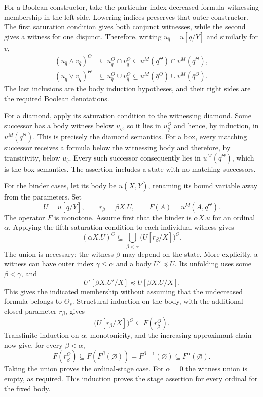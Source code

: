 For a Boolean constructor, take the particular
index-decreased formula witnessing membership in
the left side. Lowering indices preserves that
outer constructor. The first saturation condition
gives both conjunct witnesses, while the second
gives a witness for one disjunct. Therefore, writing
\(u_{\bar q}=u[\bar q/\bar Y]\) and similarly
for \(v\),
\[
\begin{aligned}
 (u_{\bar q}\land v_{\bar q})^\Theta
     &\subseteq u_{\bar q}^\Theta\cap v_{\bar q}^\Theta
       \subseteq u^M(\bar q^\Theta)\cap v^M(\bar q^\Theta),\\
 (u_{\bar q}\lor v_{\bar q})^\Theta
     &\subseteq u_{\bar q}^\Theta\cup v_{\bar q}^\Theta
       \subseteq u^M(\bar q^\Theta)\cup v^M(\bar q^\Theta).
\end{aligned}
\]
The last inclusions are the body induction hypotheses,
and their right sides are the required Boolean denotations.

For a diamond, apply its saturation condition to
the witnessing diamond. Some successor has a body
witness below \(u_{\bar q}\), so it lies in
\(u_{\bar q}^\Theta\) and hence, by induction,
in \(u^M(\bar q^\Theta)\). This is precisely the
diamond semantics. For a box, every matching
successor receives a formula below the witnessing
body and therefore, by transitivity, below
\(u_{\bar q}\). Every such successor consequently
lies in \(u^M(\bar q^\Theta)\), which is the
box semantics. The assertion includes a state
with no matching successors.

For the binder cases, let its body be
\(u(X,\bar Y)\), renaming its bound variable
away from the parameters. Set
\[
 U=u[\bar q/\bar Y],\qquad
 r_\beta=\beta X.U,\qquad
 F(A)=u^M(A,\bar q^\Theta).
\]
The operator \(F\) is monotone. Assume first
that the binder is \(\alpha X.u\) for an
ordinal \(\alpha\). Applying the fifth
saturation condition to each individual witness gives
\[
 (\alpha X.U)^\Theta
       \subseteq\bigcup_{\beta<\alpha}
                  \bigl(U[r_\beta/X]\bigr)^\Theta.
\]
The union is necessary: the witness \(\beta\)
may depend on the state. More explicitly, a witness
can have outer index \(\gamma\leq\alpha\) and
a body \(U'\preceq U\). Its unfolding uses some
\(\beta<\gamma\), and
\[
 U'[\beta X.U'/X]\preceq U[\beta X.U/X].
\]
This gives the indicated membership without assuming
that the undecreased formula belongs to \(\Theta_s\).
Structural induction on the body, with the additional
closed parameter \(r_\beta\), gives
\[
 \bigl(U[r_\beta/X]\bigr)^\Theta
       \subseteq F(r_\beta^\Theta).
\]
Transfinite induction on \(\alpha\), monotonicity,
and the increasing approximant chain now give,
for every \(\beta<\alpha\),
\[
 F(r_\beta^\Theta)
       \subseteq F(F^\beta(\varnothing))
       =F^{\beta+1}(\varnothing)
       \subseteq F^\alpha(\varnothing).
\]
Taking the union proves the ordinal-stage case.
For \(\alpha=0\) the witness union is empty,
as required. This induction proves the stage
assertion for every ordinal for the fixed body.

